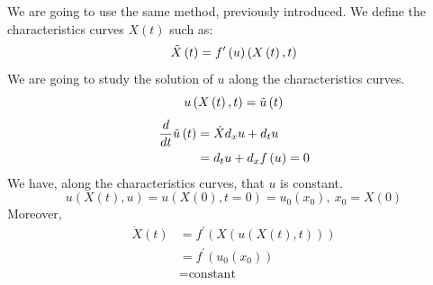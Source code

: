         We are going to use the same method, previously introduced.
        We define the characteristics curves $X\left(t\right)$ such as:
        \begin{equation*}
            \Tilde{X}\left(t\right) = f^\prime\left(u\right) \left(X\left(t\right), t\right)
        \end{equation*}
        We are going to study the solution of $u$ along the characteristics curves.
        \begin{equation}
            u\left(X\left(t\right),t\right) = \Tilde{u}\left(t\right)
        \end{equation}
        \begin{align*}
            \frac{d}{d t}\Tilde{u}\left(t\right) &= \dot X d_x u + d_t u \\
                                      &= d_t u + d_x f\left(u\right) = 0
        \end{align*}
        We have, along the characteristics curves, that $u$ is constant.
        \begin{equation}
            u\left(X\left(t\right), u\right) = u\left(X\left(0\right), t=0\right) = u_0\left(x_0\right), ~x_0 = X\left(0\right)
        \end{equation}
        Moreover,
        \begin{align*}
            \dot X\left(t\right) &= f^\prime\left(X\left(u\left(X\left(t\right),t\right)\right)\right) \\
                      &= f^\prime\left(u_0\left(x_0\right)\right) \\
                      &= \text{constant}
        \end{align*}
    
